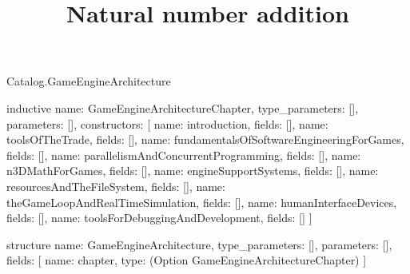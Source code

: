 \begin{lexlean}{Catalog.GameEngineArchitecture}
\title{Natural number addition}
\begin{semanticmodule}
inductive{
  name: GameEngineArchitectureChapter,
  type_parameters: [],
  parameters: [],
  constructors: [
    {name: introduction, fields: []},
    {name: toolsOfTheTrade, fields: []},
    {name: fundamentalsOfSoftwareEngineeringForGames, fields: []},
    {name: parallelismAndConcurrentProgramming, fields: []},
    {name: n3DMathForGames, fields: []},
    {name: engineSupportSystems, fields: []},
    {name: resourcesAndTheFileSystem, fields: []},
    {name: theGameLoopAndRealTimeSimulation, fields: []},
    {name: humanInterfaceDevices, fields: []},
    {name: toolsForDebuggingAndDevelopment, fields: []}
  ]
}

structure{
  name: GameEngineArchitecture,
  type_parameters: [],
  parameters: [],
  fields: [
    {name: chapter, type: (Option GameEngineArchitectureChapter)}
  ]
}
\end{semanticmodule}
\end{lexlean}
